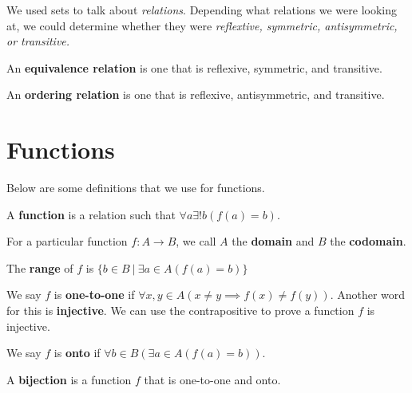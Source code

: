 
We used sets to talk about \textit{relations}. Depending what relations we were looking at, we could determine whether they were \textit{reflextive, symmetric, antisymmetric, or transitive.}

\begin{definition}
	An \textbf{equivalence relation} is one that is reflexive, symmetric, and transitive.
\end{definition}

\begin{definition}
	An \textbf{ordering relation} is one that is reflexive, antisymmetric, and transitive.
\end{definition}

\section{Functions}

Below are some definitions that we use for functions.

\begin{definition}
	A \textbf{function} is a relation such that \( \forall a \exists !b (f(a) = b) \).
\end{definition}

\begin{definition}
	For a particular function \( f \colon A \to B  \), we call \( A \) the \textbf{domain} and \( B \) the \textbf{codomain}.
\end{definition}

\begin{definition}
	The \textbf{range} of \( f \) is \( \{b \in  B ~|~ \exists  a \in  A (f(a) = b)\}   \)
\end{definition}

\begin{definition}
	We say \( f \) is \textbf{one-to-one} if \( \forall x,y \in A(x \neq  y \implies f(x) \neq f(y)) \). Another word for this is \textbf{injective}. We can use the contrapositive to prove a function \( f \) is injective.
\end{definition}

\begin{definition}
	We say \( f \) is \textbf{onto} if \( \forall b \in B (\exists a \in  A(f(a) = b)) \).
\end{definition}

\begin{definition}
	A \textbf{bijection} is a function \( f \) that is one-to-one and onto.
\end{definition}

